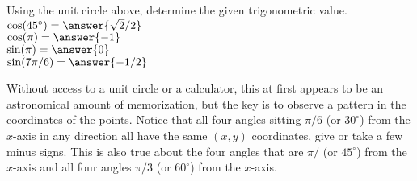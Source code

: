 \documentclass{ximera}
\begin{document}
\begin{example}
Using the unit circle above, determine the given trigonometric value.
\\$\cos(45^{\circ})=\answer{\sqrt{2}/2}$
\\$\cos(\pi)=\answer{-1}$
\\$\sin(\pi)=\answer{0}$
\\$\sin(7\pi/6)=\answer{-1/2}$
\end{example}

Without access to a unit circle or a calculator, this at first appears to be an astronomical amount of memorization, but the key is to observe a pattern in the coordinates of the points. Notice that all four angles sitting $\pi/6$ (or $30^{\circ}$) from the $x$-axis in any direction all have the same $(x,y)$ coordinates, give or take a few minus signs. This is also true about the four angles that are $\pi/$ (or $45^{\circ}$) from the $x$-axis and all four angles $\pi/3$ (or $60^{\circ}$) from the $x$-axis.


    
\end{document}
